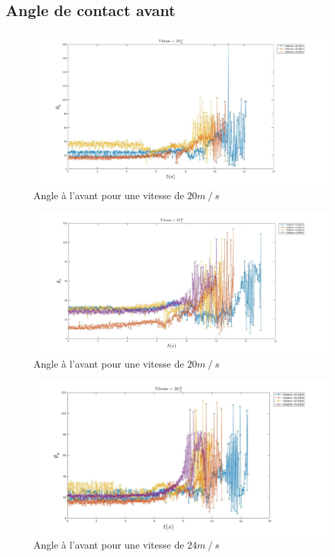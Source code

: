 \documentclass[french]{article}
\begin{document}
\subsection{Angle de contact avant}
\begin{figure}[h]
	\centering
	\includegraphics[width = \linewidth]{./image/v=20oa_1.jpg}
	\caption{Angle à l'avant pour une vitesse de $20m\mathbin{/}s$}
\end{figure}
\begin{figure}[h]
	\centering
	\includegraphics[width = \linewidth]{./image/v=20oa_2.jpg}
	\caption{Angle à l'avant pour une vitesse de $20m\mathbin{/}s$}
\end{figure}
\begin{figure}[h]
	\centering
	\includegraphics[width = \linewidth]{./image/v=24oa_1.jpg}
	\caption{Angle à l'avant pour une vitesse de $24m\mathbin{/}s$}
\end{figure}
\end{document}
